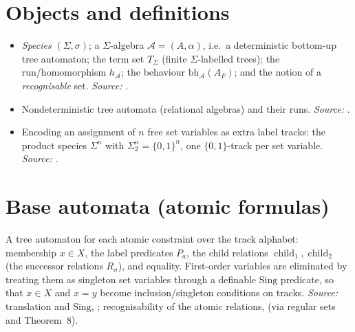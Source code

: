 \documentclass[11pt]{article}
\begin{document}
\section{Objects and definitions}
\begin{itemize}[leftmargin=*]
  \item \emph{Species} \((\Sigma,\sigma)\); a \(\Sigma\)-algebra
    \(\mathcal A=(A,\alpha)\), i.e.\ a deterministic bottom-up tree automaton; the
    term set \(T_\Sigma\) (finite \(\Sigma\)-labelled trees); the run/homomorphism
    \(h_{\mathcal A}\); the behaviour \(\mathrm{bh}_{\mathcal A}(A_F)\); and the
    notion of a \emph{recognisable} set.
    \hfill\emph{Source:} \cite[\S\,2, pp.~59--61]{TW}.
  \item Nondeterministic tree automata (relational algebras) and their runs.
    \hfill\emph{Source:} \cite[\S\,2, pp.~60--61]{TW}.
  \item Encoding an assignment of \(n\) free set variables as extra label tracks:
    the product species \(\Sigma^{n}\) with \(\Sigma^{n}_2=\{0,1\}^n\), one
    \(\{0,1\}\)-track per set variable.
    \hfill\emph{Source:} \cite[\S\,4, step~(II) p.~74; Lemma~16 p.~78]{TW}.
\end{itemize}

\section{Base automata (atomic formulas)}
A tree automaton for each atomic constraint over the track alphabet: membership
\(x\in X\), the label predicates \(P_a\), the child relations
\(\operatorname{child}_1,\operatorname{child}_2\) (the successor relations
\(R_\sigma\)), and equality.  First-order variables are eliminated by treating
them as singleton set variables through a definable \(\mathrm{Sing}\) predicate,
so that \(x\in X\) and \(x=y\) become inclusion/singleton conditions on tracks.
\hfill\emph{Source:} translation and \(\mathrm{Sing}\), \cite[\S\,4,
pp.~74--75]{TW}; recognisability of the atomic relations, \cite[Lemma~18,
pp.~78--79]{TW} (via regular sets and Theorem~8).
\end{document}
